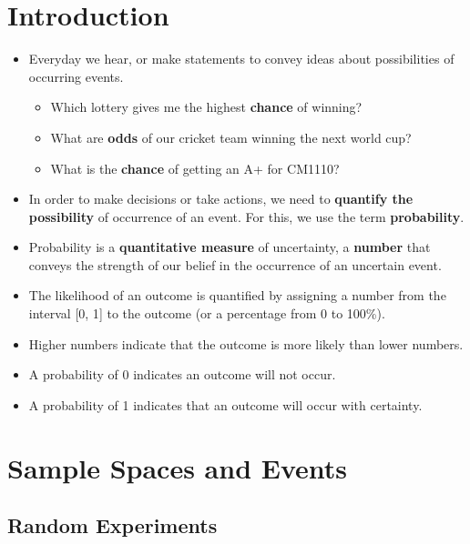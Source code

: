 \documentclass[]{book}
\providecommand{\tightlist}{%
  \setlength{\itemsep}{0pt}\setlength{\parskip}{0pt}}
\begin{document}

\hypertarget{introduction}{%
\section{Introduction}\label{introduction}}

\begin{itemize}
\tightlist
\item
  Everyday we hear, or make statements to convey ideas about possibilities of occurring events.

  \begin{itemize}
  \tightlist
  \item
    Which lottery gives me the highest \textbf{chance} of winning?
  \item
    What are \textbf{odds} of our cricket team winning the next world cup?
  \item
    What is the \textbf{chance} of getting an A+ for CM1110?
  \end{itemize}
\item
  In order to make decisions or take actions, we need to \textbf{quantify the possibility} of occurrence of an event. For this, we use the term \textbf{probability}.
\item
  Probability is a \textbf{quantitative measure} of uncertainty, a \textbf{number} that conveys the strength of our belief in the occurrence of an uncertain event.
\item
  The likelihood of an outcome is quantified by assigning a number from the interval {[}0, 1{]} to the outcome (or a percentage from 0 to 100\%).
\item
  Higher numbers indicate that the outcome is more likely than lower numbers.
\item
  A probability of 0 indicates an outcome will not occur.
\item
  A probability of 1 indicates that an outcome will occur with certainty.
\end{itemize}

\hypertarget{sample-spaces-and-events}{%
\section{Sample Spaces and Events}\label{sample-spaces-and-events}}

\hypertarget{random-experiments}{%
\subsection{Random Experiments}\label{random-experiments}}
\end{document}
